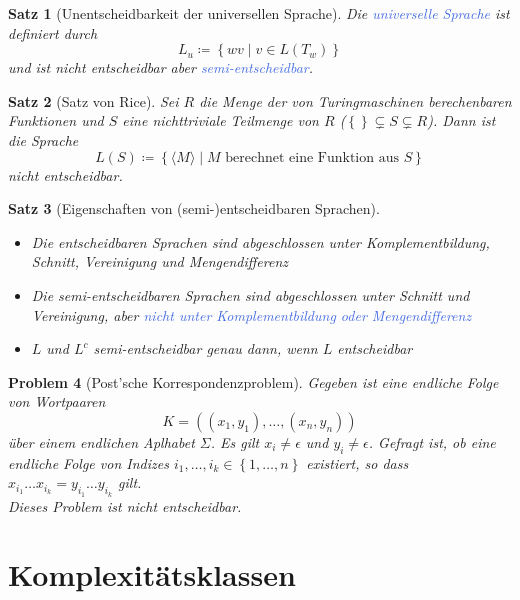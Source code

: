 \documentclass[11pt]{article}
\newcommand{\tcol}[1]{\textcolor{RoyalBlue}{#1}}
\newcommand{\set}[1]{\left\lbrace #1\right\rbrace}
\theoremstyle{break}
\newtheorem{satz}{Satz}[section]
\newtheorem{prob}[satz]{Problem}
\begin{document}
\begin{satz}[Unentscheidbarkeit der universellen Sprache]
Die \tcol{universelle Sprache} ist definiert durch
\[L_u\coloneqq\set{wv\mid v\in L(T_w)}\]
und ist nicht entscheidbar aber \tcol{semi-entscheidbar}.
\end{satz}

\begin{satz}[Satz von Rice]
Sei $R$ die Menge der von Turingmaschinen berechenbaren Funktionen und $S$ eine nichttriviale Teilmenge von $R$ ($\set{}\subsetneq S\subsetneq R$). Dann ist die Sprache
\[L(S)\coloneqq\set{\langle M\rangle\mid M\text{ berechnet eine Funktion aus }S}\]
nicht entscheidbar.
\end{satz}

\begin{satz}[Eigenschaften von (semi-)entscheidbaren Sprachen]
\begin{itemize}
\item Die entscheidbaren Sprachen sind abgeschlossen unter Komplementbildung, Schnitt, Vereinigung und Mengendifferenz
\item Die semi-entscheidbaren Sprachen sind abgeschlossen unter Schnitt und Vereinigung, aber \tcol{nicht unter Komplementbildung oder Mengendifferenz}
\item $L$ und $L^c$ semi-entscheidbar genau dann, wenn $L$ entscheidbar
\end{itemize}
\end{satz}

\begin{prob}[Post'sche Korrespondenzproblem]
Gegeben ist eine endliche Folge von Wortpaaren
\[K=((x_1,y_1),\dots,(x_n,y_n))\]
über einem endlichen Aplhabet $\Sigma$. Es gilt $x_i\neq\epsilon$ und $y_i\neq\epsilon$. Gefragt ist, ob eine endliche Folge von Indizes $i_1,\dots,i_k\in\set{1,\dots,n}$ existiert, so dass $x_{i_1}\dots x_{i_k}=y_{i_1}\dots y_{i_k}$ gilt.\\
Dieses Problem ist nicht entscheidbar.
\end{prob}



\section{Komplexitätsklassen}
\end{document}
